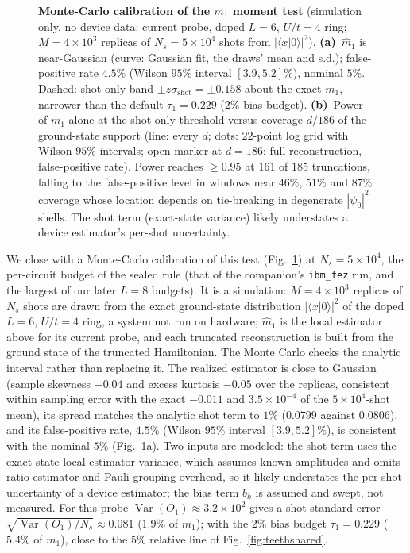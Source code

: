 \documentclass[submission, PhysCore]{SciPost}
\begin{document}
\begin{appendix}
\begin{figure}[t]
\centering
{}
\caption{\textbf{Monte-Carlo calibration of the $m_1$ moment test} (simulation only, no device data: current probe, doped $L=6$, $U/t=4$ ring; $M=4\times10^3$ replicas of ${N_s=5\times10^4}$ shots from $|\langle x|0\rangle|^2$). \textbf{(a)}~$\widehat m_1$ is near-Gaussian (curve: Gaussian fit, the draws' mean and s.d.); false-positive rate $4.5\%$ (Wilson $95\%$ interval $[3.9,5.2]\%$), nominal $5\%$. Dashed: shot-only band $\pm z\sigma_{\mathrm{shot}}=\pm0.158$ about the exact $m_1$, narrower than the default ${\tau_1=0.229}$ ($2\%$ bias budget). \textbf{(b)}~Power of $m_1$ alone at the shot-only threshold versus coverage $d/186$ of the ground-state support (line: every $d$; dots: $22$-point log grid with Wilson $95\%$ intervals; open marker at $d=186$: full reconstruction, false-positive rate). Power reaches $\ge0.95$ at $161$ of $185$ truncations, falling to the false-positive level in windows near $46\%$, $51\%$ and $87\%$ coverage whose location depends on tie-breaking in degenerate $|\psi_0|^2$ shells. The shot term (exact-state variance) likely understates a device estimator's per-shot uncertainty.}
\label{fig:momentmc}
\end{figure}
We close with a Monte-Carlo calibration of this test (Fig.~\ref{fig:momentmc}) at $N_s=5\times10^4$, the per-circuit budget of the sealed rule (that of the companion's \texttt{ibm\_fez} run, and the largest of our later $L=8$ budgets). It is a simulation: $M=4\times10^3$ replicas of $N_s$ shots are drawn from the exact ground-state distribution $|\langle x|0\rangle|^2$ of the doped $L=6$, $U/t=4$ ring, a system not run on hardware; $\widehat m_1$ is the local estimator above for its current probe, and each truncated reconstruction is built from the ground state of the truncated Hamiltonian. The Monte Carlo checks the analytic interval rather than replacing it. The realized estimator is close to Gaussian (sample skewness $-0.04$ and excess kurtosis $-0.05$ over the replicas, consistent within sampling error with the exact $-0.011$ and $3.5\times10^{-4}$ of the $5\times10^4$-shot mean), its spread matches the analytic shot term to $1\%$ ($0.0799$ against $0.0806$), and its false-positive rate, $4.5\%$ (Wilson $95\%$ interval $[3.9,5.2]\%$), is consistent with the nominal $5\%$ (Fig.~\ref{fig:momentmc}a). Two inputs are modeled: the shot term uses the exact-state local-estimator variance, which assumes known amplitudes and omits ratio-estimator and Pauli-grouping overhead, so it likely understates the per-shot uncertainty of a device estimator; the bias term $b_k$ is assumed and swept, not measured. For this probe $\operatorname{Var}(O_1)\approx3.2\times10^{2}$ gives a shot standard error $\sqrt{\operatorname{Var}(O_1)/N_s}\approx0.081$ ($1.9\%$ of $m_1$); with the $2\%$ bias budget $\tau_1=0.229$ ($5.4\%$ of $m_1$), close to the $5\%$ relative line of Fig.~\ref{fig:teethshared}.


\end{appendix}
\end{document}
